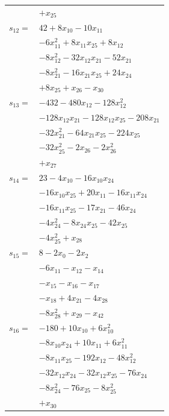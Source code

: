 \begin{longtable}{@{}r@{\;}l@{}}
 & \(\displaystyle +x_{25}\) \\[3pt]
\(s_{12}=\) & \(\displaystyle 42 +8x_{10} -10x_{11}\) \\
 & \(\displaystyle -6x_{11}^{2} +8x_{11}x_{25} +8x_{12}\) \\
 & \(\displaystyle -8x_{12}^{2} -32x_{12}x_{21} -52x_{21}\) \\
 & \(\displaystyle -8x_{21}^{2} -16x_{21}x_{25} +24x_{24}\) \\
 & \(\displaystyle +8x_{25} +x_{26} -x_{30}\) \\[3pt]
\(s_{13}=\) & \(\displaystyle -432 -480x_{12} -128x_{12}^{2}\) \\
 & \(\displaystyle -128x_{12}x_{21} -128x_{12}x_{25} -208x_{21}\) \\
 & \(\displaystyle -32x_{21}^{2} -64x_{21}x_{25} -224x_{25}\) \\
 & \(\displaystyle -32x_{25}^{2} -2x_{26} -2x_{26}^{2}\) \\
 & \(\displaystyle +x_{27}\) \\[3pt]
\(s_{14}=\) & \(\displaystyle 23 -4x_{10} -16x_{10}x_{24}\) \\
 & \(\displaystyle -16x_{10}x_{25} +20x_{11} -16x_{11}x_{24}\) \\
 & \(\displaystyle -16x_{11}x_{25} -17x_{21} -46x_{24}\) \\
 & \(\displaystyle -4x_{24}^{2} -8x_{24}x_{25} -42x_{25}\) \\
 & \(\displaystyle -4x_{25}^{2} +x_{28}\) \\[3pt]
\(s_{15}=\) & \(\displaystyle 8 -2x_{0} -2x_{2}\) \\
 & \(\displaystyle -6x_{11} -x_{12} -x_{14}\) \\
 & \(\displaystyle -x_{15} -x_{16} -x_{17}\) \\
 & \(\displaystyle -x_{18} +4x_{21} -4x_{28}\) \\
 & \(\displaystyle -8x_{28}^{2} +x_{29} -x_{42}\) \\[3pt]
\(s_{16}=\) & \(\displaystyle -180 +10x_{10} +6x_{10}^{2}\) \\
 & \(\displaystyle -8x_{10}x_{24} +10x_{11} +6x_{11}^{2}\) \\
 & \(\displaystyle -8x_{11}x_{25} -192x_{12} -48x_{12}^{2}\) \\
 & \(\displaystyle -32x_{12}x_{24} -32x_{12}x_{25} -76x_{24}\) \\
 & \(\displaystyle -8x_{24}^{2} -76x_{25} -8x_{25}^{2}\) \\
 & \(\displaystyle +x_{30}\) \\[3pt]

\end{longtable}
